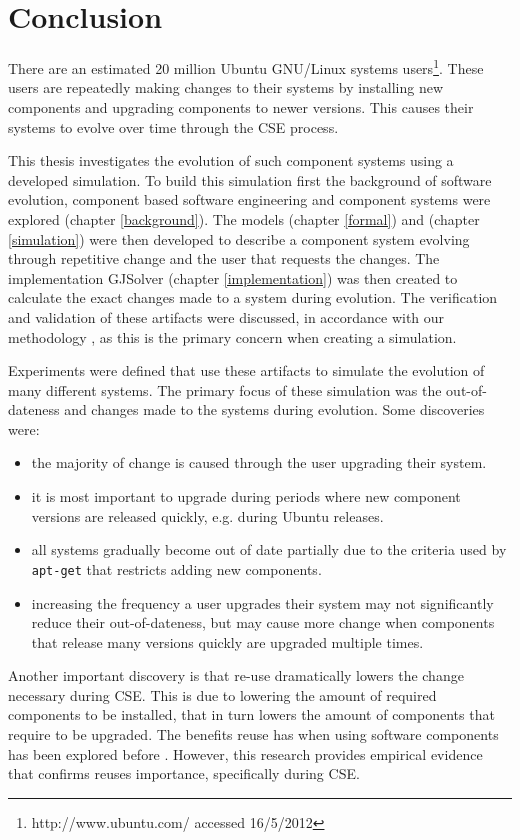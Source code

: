 \chapter{Conclusion}
\label{conclusion}
There are an estimated 20 million Ubuntu GNU/Linux systems users\footnote{http://www.ubuntu.com/ accessed 16/5/2012}.
These users are repeatedly making changes to their systems by installing new components and upgrading components to newer versions.
This causes their systems to evolve over time through the CSE process.

This thesis investigates the evolution of such component systems using a developed simulation.
To build this simulation first the background of software evolution, component based software engineering and component systems were explored (chapter \ref{background}).
The models \modelname (chapter \ref{formal}) and \usermodel (chapter \ref{simulation}) were then developed 
to describe a component system evolving through repetitive change and the user that requests the changes.
The implementation GJSolver (chapter \ref{implementation}) was then created to calculate the exact changes made to a system during evolution.
The verification and validation of these artifacts were discussed, in accordance with our methodology \cite{Law2005}, 
as this is the primary concern when creating a simulation.

Experiments were defined that use these artifacts to simulate the evolution of many different systems.
The primary focus of these simulation was the out-of-dateness and changes made to the systems during evolution.
Some discoveries were:
\begin{itemize}
  \item the majority of change is caused through the user upgrading their system.
  \item it is most important to upgrade during periods where new component versions are released quickly, e.g. during Ubuntu releases.
  \item all systems gradually become out of date partially due to the criteria used by \texttt{apt-get} that restricts adding new components.
  \item increasing the frequency a user upgrades their system may not significantly reduce their out-of-dateness, 
  but may cause more change when components that release many versions quickly are upgraded multiple times.
\end{itemize} 

Another important discovery is that re-use dramatically lowers the change necessary during CSE.
This is due to lowering the amount of required components to be installed,
that in turn lowers the amount of components that require to be upgraded.
The benefits reuse has when using software components has been explored before \citep{Szyperski2002}.
However, this research provides empirical evidence that confirms reuses importance, specifically during CSE.


